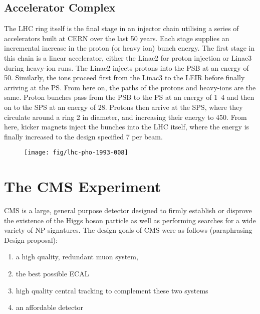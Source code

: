 \subsection{Accelerator Complex}
The \ac{LHC} ring itself is the final stage in an injector chain utilising a
series of accelerators built at CERN over the last 50 years. Each stage supplies
an incremental increase in the proton (or heavy ion) bunch energy. The first
stage in this chain is a linear accelerator, either the Linac2 for proton
injection or Linac3 during heavy-ion runs. The Linac2 injects protons into the
\ac{PSB} at an energy of \unit{50}{\mega\electronvolt}. Similarly, the ions
proceed first from the Linac3 to the \ac{LEIR} before finally arriving at the
\ac{PS}. From here on, the paths of the protons and heavy-ions are the
same. Proton bunches pass from the \ac{PSB} to the \ac{PS} at an energy of
\unit{1.4}{\giga\electronvolt} and then on to the \ac{SPS} at an energy of
\unit{28}{\giga\electronvolt}. Protons then arrive at the \ac{SPS}, where they
circulate around a ring \unit{2}{\kilo\metre} in diameter, and increasing their
energy to \unit{450}{\giga\electronvolt}. From here, kicker magnets inject the
bunches into the \ac{LHC} itself, where the energy is finally increased to the
design specified \unit{7}{\TeV} per beam.
\begin{figure}
\texttt{[image: fig/lhc-pho-1993-008]}
\end{figure}




\section{The \acl{CMS} Experiment}
\label{sec:cms}
\ac{CMS} is a large, general purpose detector\cite{cms_jinst} designed to firmly establish or
disprove the existence of the Higgs boson particle as well as performing
searches for a wide variety of \ac{NP} signatures. The design goals of CMS were
as follows (paraphrasing Design proposal):
\begin{enumerate}
\item a high quality, redundant muon system,
\item the best possible \ac{ECAL}
\item high quality central tracking to complement these two systems
\item an affordable detector
\end{enumerate}

